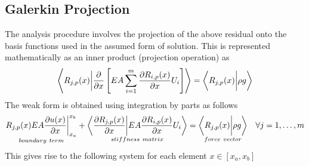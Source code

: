 \documentclass[submit,12pt]{aiaa-pretty} %
\begin{document}
\subsection{Galerkin Projection}
The analysis procedure involves the projection of the above residual
onto the basis functions used in the assumed form of solution. This is
represented mathematically as an inner product (projection operation) as
\begin{equation}\nonumber
  \left\langle  {\color{black}{R_{j,p}(x)}} \bigg\vert {\color{black}{\dfrac{\partial }{\partial x} \left[ EA \sum_{i=1}^{m} \dfrac{\partial R_{i,p}(x)}{\partial x}  U_i  \right]}} \right\rangle  =
  \left\langle  {\color{black}{R_{j,p}(x)}} \bigg\vert {\color{black}{\rho g}} \right\rangle 
\end{equation}
The weak form is obtained using integration by parts as follows
\begin{equation}\nonumber
  \begin{gathered}
    \underset{boundary~term}{{{R_{j,p}(x) EA \dfrac{\partial u(x)}{\partial x}}}  \bigg\vert_{x_a}^{x_b}} +  \underset{stiffness~matrix}{\left\langle {\color{black}{\dfrac{\partial R_{j,p}(x)}{\partial x}}}  \bigg\vert  {\color{black}{EA  \dfrac{\partial R_{i,p}(x)}{\partial x}  U_i}}   \right\rangle}  = 
    \underset{force~vector}{\left\langle {\color{black}{R_{j,p}(x)}} \bigg\vert {\color{black}{\rho g}} \right\rangle} \quad \forall j = 1, \ldots,m
  \end{gathered}
\end{equation}
This gives rise to the following system for each element $x \in [x_a,
  x_b]$
\end{document}
